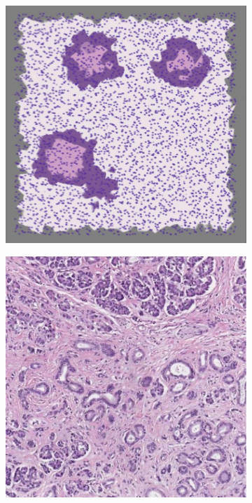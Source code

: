 \begin{description}
        \begin{figure}
            \centering
            \begin{subfigure}[t]{0.3\textwidth}
                 \centering
                 \includegraphics[width = \textwidth]{images/st_nn1}
                 \caption{}
                 \label{fig:st_nn1}
            \end{subfigure}
            \quad
            \begin{subfigure}[t]{0.3\textwidth}
                 \centering
                 \includegraphics[width = \textwidth]{images/st_nn2}

\end{subfigure}
\end{figure}
\end{description}
